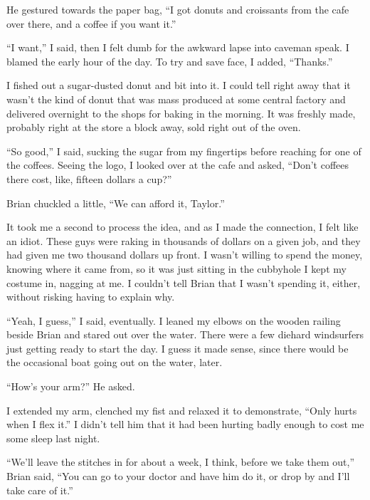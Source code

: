 He gestured towards the paper bag, ``I got donuts and croissants from the cafe over there, and a coffee if you want it.''



``I want,'' I said, then I felt dumb for the awkward lapse into caveman speak.  I blamed the early hour of the day.  To try and save face, I added, ``Thanks.''



I fished out a sugar-dusted donut and bit into it.  I could tell right away that it wasn't the kind of donut that was mass produced at some central factory and delivered overnight to the shops for baking in the morning.  It was freshly made, probably right at the store a block away, sold right out of the oven.



``So good,'' I said, sucking the sugar from my fingertips before reaching for one of the coffees.  Seeing the logo, I looked over at the cafe and asked, ``Don't coffees there cost, like, fifteen dollars a cup?''



Brian chuckled a little, ``We can afford it, Taylor.''



It took me a second to process the idea, and as I made the connection, I felt like an idiot.  These guys were raking in thousands of dollars on a given job, and they had given me two thousand dollars up front.  I wasn't willing to spend the money, knowing where it came from, so it was just sitting in the cubbyhole I kept my costume in, nagging at me.  I couldn't tell Brian that I wasn't spending it, either, without risking having to explain why.



``Yeah, I guess,'' I said, eventually.  I leaned my elbows on the wooden railing beside Brian and stared out over the water.  There were a few diehard windsurfers just getting ready to start the day.  I guess it made sense, since there would be the occasional boat going out on the water, later.



``How's your arm?'' He asked.



I extended my arm, clenched my fist and relaxed it to demonstrate, ``Only hurts when I flex it.''  I didn't tell him that it had been hurting badly enough to cost me some sleep last night.



``We'll leave the stitches in for about a week, I think, before we take them out,'' Brian said, ``You can go to your doctor and have him do it, or drop by and I'll take care of it.''




